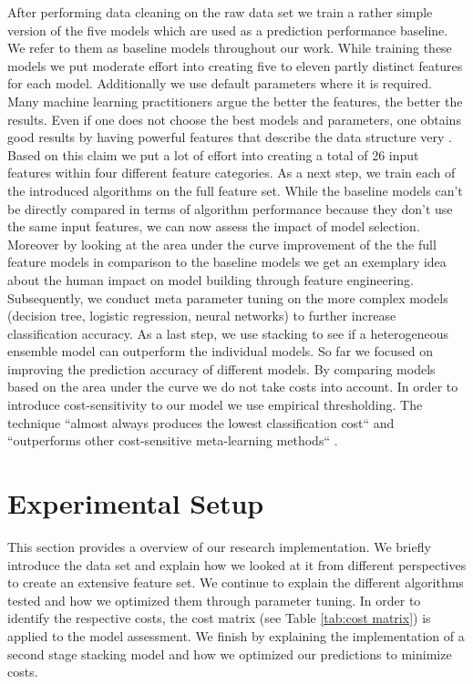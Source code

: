 \documentclass[12pt]{article}
\begin{document}
After performing data cleaning on the raw data set we train a rather simple version of the five models which are used as a prediction performance baseline. We refer to them as baseline models throughout our work. While training these models we put moderate effort into creating five to eleven partly distinct features for each model. Additionally we use default parameters where it is required. 
Many machine learning practitioners argue the better the features, the better the results. Even if one does not choose the best models and parameters, one obtains good results by having powerful features that describe the data structure very \cite{WinNT2}. Based on this claim we put a lot of effort into creating a total of 26 input features within four different feature categories. 
As a next step, we train each of the introduced algorithms on the full feature set. While the baseline models can’t be directly compared in terms of algorithm performance because they don’t use the same input features, we can now assess the impact of model selection. Moreover by looking at the area under the curve improvement of the the full feature models in comparison to the baseline models we get an exemplary idea about the human impact on model building through feature engineering. Subsequently, we conduct meta parameter tuning on the more complex models (decision tree, logistic regression, neural networks) to further increase classification accuracy. As a last step, we use stacking to see if a heterogeneous ensemble model can outperform the individual models. 
So far we focused on improving the prediction accuracy of different models. By comparing models based on the area under the curve we do not take costs into account. In order to introduce cost-sensitivity to our model we use empirical thresholding. The technique ``almost always produces the lowest classification cost`` and ``outperforms other cost-sensitive meta-learning methods`` \cite{sheng2006thresholding}.


\section{Experimental Setup}
This section provides a overview of our research implementation. We briefly introduce the data set and explain how we looked at it from different perspectives to create an extensive feature set. We continue to explain the different algorithms tested and how we optimized them through parameter tuning. In order to identify the respective costs, the cost matrix (see Table \ref{tab:cost matrix}) is applied to the model assessment. We finish by explaining the implementation of a second stage stacking model and how we optimized our predictions to minimize costs. 
\end{document}
